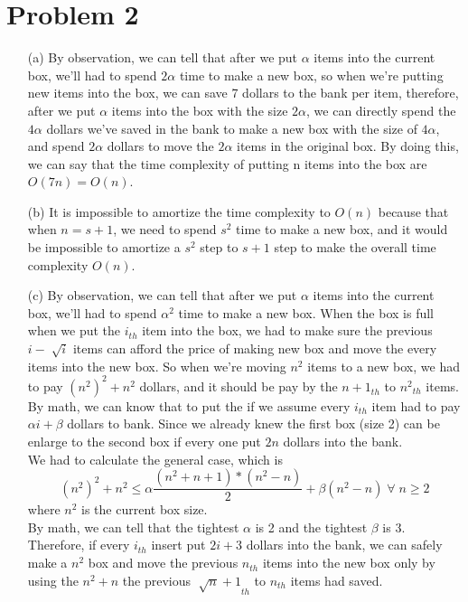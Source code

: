 \documentclass{homework}
\begin{document}
\section*{Problem 2}
\begin{itemize}
    \item[(a)]
    By observation, we can tell that after we put $\alpha$ items into the current box, we'll had to spend $2\alpha$ time to make a new box, so when we're putting new items into the box, we can save 7 dollars to the bank per item, therefore, after we put $\alpha$ items into the box with the size $2\alpha$, we can directly spend the $4\alpha$ dollars we've saved in the bank to make a new box with the size of $4\alpha$, and spend $2\alpha$ dollars to move the $2\alpha$ items in the original box. By doing this, we can say that the time complexity of putting n items into the box are $O(7n) = O(n)$. 
    
    \item[(b)]
    It is impossible to amortize the time complexity to $O(n)$ because that when $n = s + 1$, we need to spend $s^2$ time to make a new box, and it would be impossible to amortize a $s^2$ step to $s+1$ step to make the overall time complexity $O(n)$.

    \item[(c)]
    By observation, we can tell that after we put $\alpha$ items into the current box, we'll had to spend $\alpha^2$ time to make a new box. When the box is full when we put the $i_{th}$ item into the box, we had to make sure the previous $i-\sqrt[]{i}$ items can afford the price of making new box and move the every items into the new box. So when we're moving $n^2$ items to a new box, we had to pay ${(n^2)}^2+n^2$ dollars, and it should be pay by the ${n+1}_{th}$ to ${n^2}_{th}$ items. By math, we can know that to put the if we assume every $i_{th}$ item had to pay $\alpha i +\beta$ dollars to bank. Since we already knew the first box (size 2) can be enlarge to the second box if every one put $2n$ dollars into the bank.\\
    We had to calculate the general case, which is 
    \[{(n^2)}^2+n^2 \leq \alpha \frac{(n^2+n+1)*(n^2-n)}{2} + \beta (n^2-n)\;\forall\; n \geq 2\]
    where $n^2$ is the current box size.\\
    By math, we can tell that the tightest $\alpha$ is 2 and the tightest $\beta$ is 3. Therefore, if every $i_{th}$ insert put $2i+3$ dollars into the bank, we can safely make a $n^2$ box and move the previous $n_{th}$ items into the new box only by using the ${n}^2+n$ the previous ${\sqrt[]{n}+1}_{th}$ to $n_{th}$ items had saved.


\end{itemize}
\end{document}
